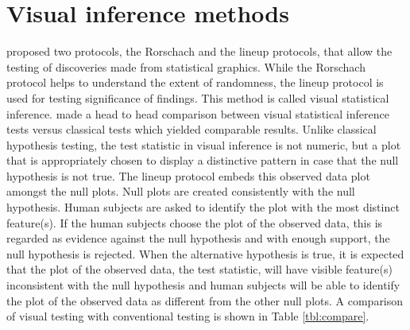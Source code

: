 \section{Visual inference methods} \label{sec:inference}

\cite{buja:2009} proposed two protocols, the Rorschach and the lineup protocols,  that allow the testing of discoveries made from statistical graphics. While the Rorschach protocol helps to understand the extent of randomness, the lineup protocol is  used for testing significance of findings. This method is called visual statistical inference. \cite{majumder:2011} made a head to head comparison between visual statistical inference tests versus classical tests which yielded comparable results. Unlike classical hypothesis testing, the test statistic in visual inference is not numeric, but a plot that is appropriately chosen to display a  distinctive pattern in case that the null hypothesis is not true. The lineup protocol embeds this observed data plot amongst the null plots. Null plots are created  consistently with the null hypothesis. Human subjects are asked to identify the plot with the most distinct feature(s). If the human subjects choose the plot of the observed data, this is regarded as evidence against the null hypothesis and with enough support, the null hypothesis is rejected. When the alternative hypothesis is true, it is expected that the plot of the observed data, the test statistic, will have visible feature(s) inconsistent with the null hypothesis and human subjects will be able to identify the plot of the observed data as different from  the other null plots. 
 A comparison of visual testing with conventional testing is shown in Table \ref{tbl:compare}.


